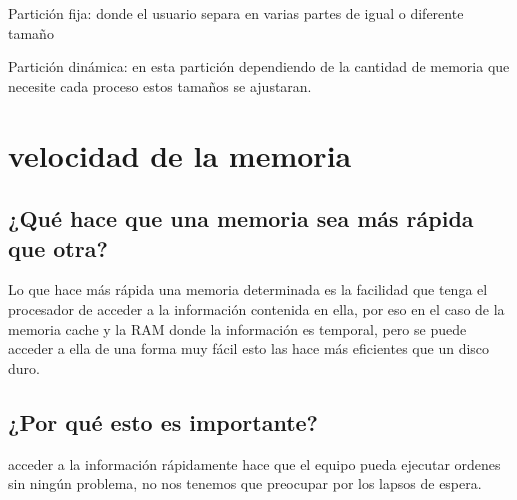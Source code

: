 \documentclass{article}
\begin{document}
Partición fija: donde el usuario separa en varias partes de igual o diferente tamaño

Partición dinámica: en esta partición dependiendo de la cantidad de memoria que necesite cada proceso estos tamaños se ajustaran. 

\vspace{0.6cm}

\section{velocidad de la memoria}

\vspace{0.3cm}

\subsection{¿Qué hace que una memoria sea más rápida que otra?}

Lo que hace más rápida una memoria determinada es la facilidad que tenga el procesador de acceder a la información contenida en ella, por eso en el caso de la memoria cache y la RAM donde la información es temporal, pero se puede acceder a ella de una forma muy fácil esto las hace más eficientes que un disco duro.

\vspace{0.3cm}

\subsection{¿Por qué esto es importante?}

acceder a la información rápidamente hace que el equipo pueda ejecutar ordenes sin ningún problema, no nos tenemos que preocupar por los lapsos de espera.



\end{document}
